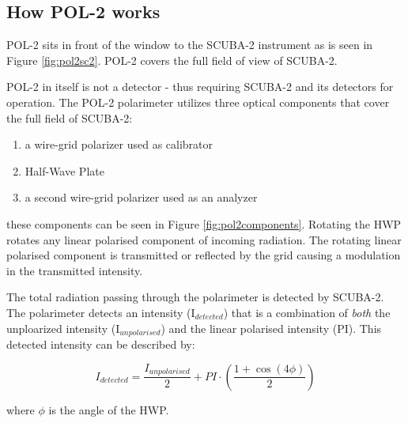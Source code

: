 \subsection*{How POL-2 works}

POL-2 sits in front of the window to the SCUBA-2 instrument
as is seen in Figure \ref{fig:pol2sc2}. POL-2 covers the full
field of view of SCUBA-2.

POL-2 in itself is not a detector - thus requiring SCUBA-2 
and its detectors for operation. The POL-2 polarimeter
utilizes three optical components
that cover the full field of SCUBA-2: 

\begin{enumerate}\itemsep-0.2em
\item a wire-grid polarizer used as calibrator
\item Half-Wave Plate
\item a second wire-grid polarizer used as an analyzer
\end{enumerate}


these components can be seen in Figure \ref{fig:pol2components}.
Rotating the HWP rotates any linear polarised component of incoming
radiation. The rotating linear polarised component is
transmitted or reflected by the grid causing a modulation in the transmitted
intensity. 

The total radiation passing through the polarimeter is detected by
SCUBA-2. The polarimeter detects an intensity (I$_{detected}$) that is a
combination of \emph{both} the unploarized intensity (I$_{unpolarised}$)
and the linear polarised intensity (PI). This detected intensity can be
described by:


\begin{equation}
I_{detected} = \frac{I_{unpolarised}}{2}+ PI\cdot\left(\frac{1+\cos(4\phi)}{2} \right)
\end{equation}

where $\phi$ is the angle of the HWP.

